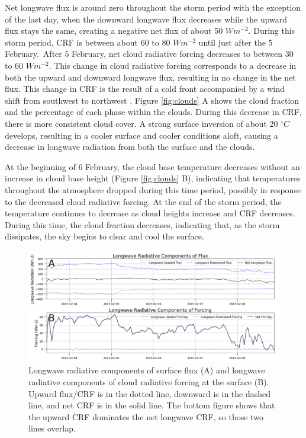 Net longwave flux is around zero throughout the storm period with the exception of the last day, when the downward longwave flux decreases while the upward flux stays the same, creating a negative net flux of about 50 $W m^{-2}$. During this storm period, CRF is between about 60 to 80 $W m^{-2}$ until just after the 5 February. After 5 February, net cloud radiative forcing decreases to between 30 to 60 $W m^{-2}$. This change in cloud radiative forcing corresponds to a decrease in both the upward and downward longwave flux, resulting in no change in the net flux. This change in CRF is the result of a cold front accompanied by a wind shift from southwest to northwest \citep{kayser:2017}. Figure \ref{fig:clouds} A shows the cloud fraction and the percentage of each phase within the clouds. During this decrease in CRF, there is more consistent cloud cover. A strong surface inversion of about 20 $^{\circ}C$ develops, resulting in a cooler surface and cooler conditions aloft, causing a decrease in longwave radiation from both the surface and the clouds. 

At the beginning of 6 February, the cloud base temperature decreases without an increase in cloud base height (Figure \ref{fig:clouds} B), indicating that temperatures throughout the atmosphere dropped during this time period, possibly in response to the decreased cloud radiative forcing. At the end of the storm period, the temperature continues to decrease as cloud heights increase and CRF decreases. During this time, the cloud fraction decreases, indicating that, as the storm dissipates, the sky begins to clear and cool the surface. 

\begin{figure}[H]
    \centering
    \includegraphics[width=1\linewidth]{figures/chapter4/ch2_f10.png}
    \caption[Longwave radiative components of flux and cloud radiative forcing]{Longwave radiative components of surface flux (A) and longwave radiative components of cloud radiative forcing at the surface (B). Upward flux/CRF is in the dotted line, downward is in the dashed line, and net CRF is in the solid line. The bottom figure shows that the upward CRF dominates the net longwave CRF, so those two lines overlap.}
    \label{fig:flux}
\end{figure}

